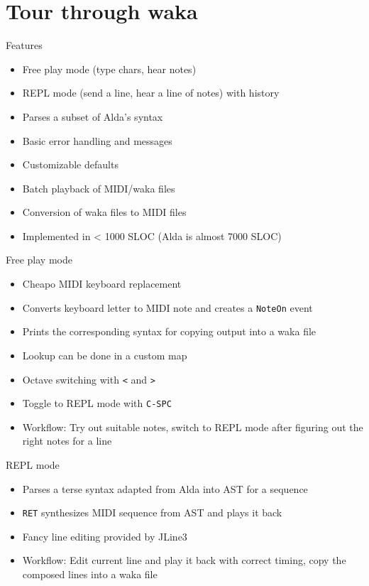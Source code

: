 \documentclass[presentation]{beamer}
\begin{document}
\section{Tour through waka}
\label{sec-3}

\begin{frame}[label=sec-3-1]{Features}
\begin{itemize}
\item Free play mode (type chars, hear notes)
\item REPL mode (send a line, hear a line of notes) with history
\item Parses a subset of Alda's syntax
\item Basic error handling and messages
\item Customizable defaults
\item Batch playback of MIDI/waka files
\item Conversion of waka files to MIDI files
\item Implemented in < 1000 SLOC (Alda is almost 7000 SLOC)
\end{itemize}
\end{frame}

\begin{frame}[fragile,label=sec-3-2]{Free play mode}
 \begin{itemize}
\item Cheapo MIDI keyboard replacement
\item Converts keyboard letter to MIDI note and creates a \texttt{NoteOn} event
\item Prints the corresponding syntax for copying output into a waka file
\item Lookup can be done in a custom map
\item Octave switching with \texttt{<} and \texttt{>}
\item Toggle to REPL mode with \texttt{C-SPC}
\item Workflow: Try out suitable notes, switch to REPL mode after figuring
out the right notes for a line
\end{itemize}
\end{frame}

\begin{frame}[fragile,label=sec-3-3]{REPL mode}
 \begin{itemize}
\item Parses a terse syntax adapted from Alda into AST for a sequence
\item \texttt{RET} synthesizes MIDI sequence from AST and plays it back
\item Fancy line editing provided by JLine3
\item Workflow: Edit current line and play it back with correct timing,
copy the composed lines into a waka file
\end{itemize}
\end{frame}
\end{document}
